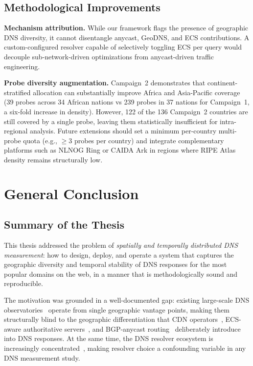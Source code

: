 \bigskip
\subsection{Methodological Improvements}
\label{subsec:5.4.3}

\textbf{Mechanism attribution.} While our framework flags the presence of geographic \ac{DNS} diversity, it cannot disentangle anycast, GeoDNS, and \ac{ECS} contributions. A custom-configured resolver capable of selectively toggling \ac{ECS} per query would decouple sub-network-driven optimizations from anycast-driven traffic engineering.

\textbf{Probe diversity augmentation.} Campaign~2 demonstrates that continent-stratified allocation can substantially improve Africa and Asia-Pacific coverage (39 probes across 34 African nations vs 239 probes in 37 nations for Campaign~1, a six-fold increase in density). However, 122 of the 136 Campaign~2 countries are still covered by a single probe, leaving them statistically insufficient for intra-regional analysis. Future extensions should set a minimum per-country multi-probe quota (e.g., $\geq$3 probes per country) and integrate complementary platforms such as NLNOG Ring or CAIDA Ark in regions where RIPE Atlas density remains structurally low.

\bigskip
\section{General Conclusion}
\label{sec:5.5}

\subsection{Summary of the Thesis}
\label{subsec:5.5.1}

This thesis addressed the problem of \emph{spatially and temporally distributed \ac{DNS} measurement}: how to design, deploy, and operate a system that captures the geographic diversity and temporal stability of \ac{DNS} responses for the most popular domains on the web, in a manner that is methodologically sound and reproducible.

The motivation was grounded in a well-documented gap: existing large-scale \ac{DNS} observatories~\cite{vanRijswijk2016} operate from single geographic vantage points, making them structurally blind to the geographic differentiation that \ac{CDN} operators~\cite{Koch2021,Hours2016}, \ac{ECS}-aware authoritative servers~\cite{RFC7871,Wang2018}, and \ac{BGP}-anycast routing~\cite{Bortzmeyer2013} deliberately introduce into \ac{DNS} responses. At the same time, the \ac{DNS} resolver ecosystem is increasingly concentrated~\cite{Xu2023}, making resolver choice a confounding variable in any \ac{DNS} measurement study.

